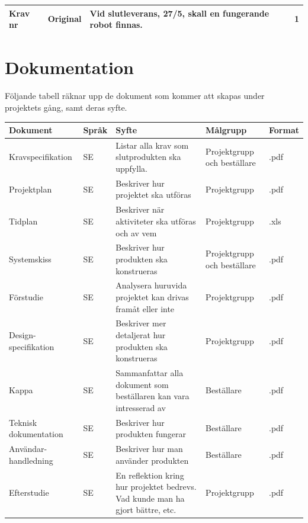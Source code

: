 \documentclass[11pt]{article}
\newcounter{kravc}
\newcommand{\kravcc}{
	\thekravc
	\stepcounter{kravc}
}
\begin{document}
\begin{flushleft}
\begin{center}
\begin{longtable}{|l|l|p{.70\linewidth}|l|} \hline

Krav nr\kravcc &
Original &
Vid slutleverans, 27/5, skall en fungerande robot finnas. &
1 \\ \hline

\end{longtable}
\end{center}


\pagebreak

\section{Dokumentation}
Följande tabell räknar upp de dokument som kommer att skapas under projektets gång, samt deras syfte.
\begin{center}
\begin{longtable}{|p{.24\linewidth}|p{.08\linewidth}|p{.25\linewidth}|p{.19\linewidth}|p{.1\linewidth}|}\hline
\textbf{Dokument} & \textbf{Språk} & \textbf{Syfte} & \textbf{Målgrupp} & \textbf{Format} \\ \hline

Kravspecifikation & SE & Listar alla krav som slutprodukten ska uppfylla. & Projektgrupp och beställare & .pdf \\ \hline
Projektplan & SE & Beskriver hur projektet ska utföras & Projektgrupp & .pdf \\ \hline
Tidplan & SE & Beskriver när aktiviteter ska utföras och av vem & Projektgrupp & .xls \\ \hline
Systemskiss & SE & Beskriver hur produkten ska konstrueras& Projektgrupp och beställare & .pdf \\ \hline
Förstudie & SE & Analysera huruvida projektet kan drivas framåt eller inte & Projektgrupp & .pdf \\ \hline
Design-specifikation & SE & Beskriver mer detaljerat hur produkten ska konstrueras & Projektgrupp & .pdf \\ \hline
Kappa & SE & Sammanfattar alla dokument som beställaren kan vara intresserad av & Beställare & .pdf \\ \hline
Teknisk dokumentation & SE & Beskriver hur produkten fungerar & Beställare & .pdf \\ \hline
Användar-handledning & SE & Beskriver hur man använder produkten& Beställare & .pdf \\ \hline
Efterstudie & SE & En reflektion kring hur projektet bedrevs. Vad kunde man ha gjort bättre, etc.& Projektgrupp & .pdf \\ \hline


\end{longtable}
\end{center}
\end{flushleft}
\end{document}
